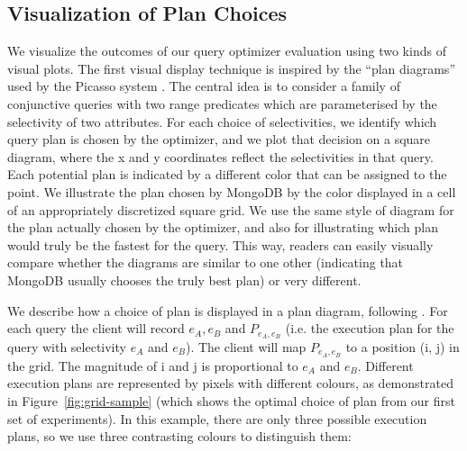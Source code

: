 \subsection{Visualization of Plan Choices} \label{sec:vm}
We visualize the outcomes of our query optimizer evaluation using two kinds of visual plots. The first visual display technique is inspired by the ``plan diagrams'' used by the Picasso system \cite{reddy2005analyzing}. The central idea is to consider a family of conjunctive queries with two range predicates which are parameterised by the selectivity of two attributes. For each choice of selectivities, we identify which query plan is chosen by the optimizer, and we plot that decision on a square diagram, where the x and y coordinates reflect the selectivities in that query. Each potential plan is indicated by a different color that can be assigned to the point. %
We illustrate the plan chosen by MongoDB by the color displayed in a cell of an appropriately discretized square grid.  We use the same style of diagram for the plan actually chosen by the optimizer, and also for illustrating which plan would truly be the fastest for the query. This way, readers can easily visually compare whether the diagrams are similar to one other (indicating that MongoDB usually chooses the truly best plan) or very different.

We describe how a choice of plan is displayed in a plan diagram, following \cite{reddy2005analyzing}. For each query the client will record $e_A, 
e_B$ and $P_{e_A, e_B}$ (i.e. the execution plan for 
the query with selectivity $e_A$ and $e_B$). The client
will map $P_{e_A, e_B}$ to a position (i, j) in the grid.
The magnitude of i and j is proportional to $e_A$ and 
$e_B$. Different execution plans are represented by 
pixels with different colours, 
as demonstrated in Figure~\ref{fig:grid-sample} 
(which shows the optimal choice of plan from 
our first set of experiments). In this example, %
there are only three possible execution
plans, so we use three contrasting colours to distinguish them:

